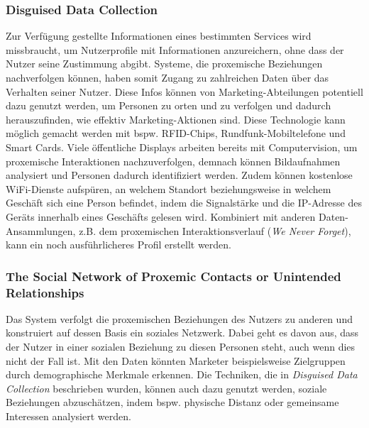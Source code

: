 \documentclass[a4paper]{article}
\begin{document}
\subsubsection{Disguised Data Collection}
\label{sssec:disguised_data_collection}
Zur Verfügung gestellte Informationen eines bestimmten Services wird missbraucht, um Nutzerprofile mit Informationen anzureichern, ohne dass der Nutzer seine Zustimmung abgibt. Systeme, die proxemische Beziehungen nachverfolgen können, haben somit Zugang zu zahlreichen Daten über das Verhalten seiner Nutzer. Diese Infos können von Marketing-Abteilungen potentiell dazu genutzt werden, um Personen zu orten und zu verfolgen und dadurch herauszufinden, wie effektiv Marketing-Aktionen sind. Diese Technologie kann möglich gemacht werden mit bspw. RFID-Chips, Rundfunk-Mobiltelefone und Smart Cards. Viele öffentliche Displays arbeiten bereits mit Computervision, um proxemische Interaktionen nachzuverfolgen, demnach können Bildaufnahmen analysiert und Personen dadurch identifiziert werden. Zudem können kostenlose WiFi-Dienste aufspüren, an welchem Standort beziehungsweise in welchem Geschäft sich eine Person befindet, indem die Signalstärke und die IP-Adresse des Geräts innerhalb eines Geschäfts gelesen wird.\newline
Kombiniert mit anderen Daten-Ansammlungen, z.B. dem proxemischen Interaktionsverlauf (\textit{We Never Forget}), kann ein noch ausführlicheres Profil erstellt werden.

\subsubsection{The Social Network of Proxemic Contacts or Unintended Relationships}
\label{sssec:the_social_network_of_proxemic_contacts}
Das System verfolgt die proxemischen Beziehungen des Nutzers zu anderen und konstruiert auf dessen Basis ein soziales Netzwerk. Dabei geht es davon aus, dass der Nutzer in einer sozialen Beziehung zu diesen Personen steht, auch wenn dies nicht der Fall ist.\newline
Mit den Daten könnten Marketer beispielsweise Zielgruppen durch demographische Merkmale erkennen. Die Techniken, die in \textit{Disguised Data Collection} beschrieben wurden, können auch dazu genutzt werden, soziale Beziehungen abzuschätzen, indem bspw. physische Distanz oder gemeinsame Interessen analysiert werden.
\end{document}
